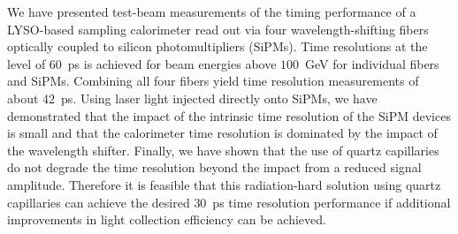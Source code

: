 
We have presented test-beam measurements of the timing performance of a
LYSO-based sampling calorimeter read out via four wavelength-shifting fibers
optically coupled to silicon photomultipliers (SiPMs). Time resolutions at the
level of $60$~ps is achieved for beam energies above $100$~GeV for individual
fibers and SiPMs. Combining all four fibers yield time resolution measurements
of about $42$~ps. Using laser light injected directly onto SiPMs, we have
demonstrated that the impact of the intrinsic time resolution of the SiPM
devices is small and that the calorimeter time resolution is dominated by the
impact of the wavelength shifter. Finally, we have shown that the use of quartz
capillaries do not degrade the time resolution beyond the impact from a reduced
signal amplitude. Therefore it is feasible that this radiation-hard solution
using quartz capillaries can achieve the desired $30$~ps time resolution
performance if additional improvements in light collection efficiency can be
achieved.
